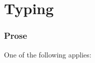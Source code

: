 \begin{mathpar}
\end{mathpar}

\section{Typing}
\subsubsection{Prose}
One of the following applies:
